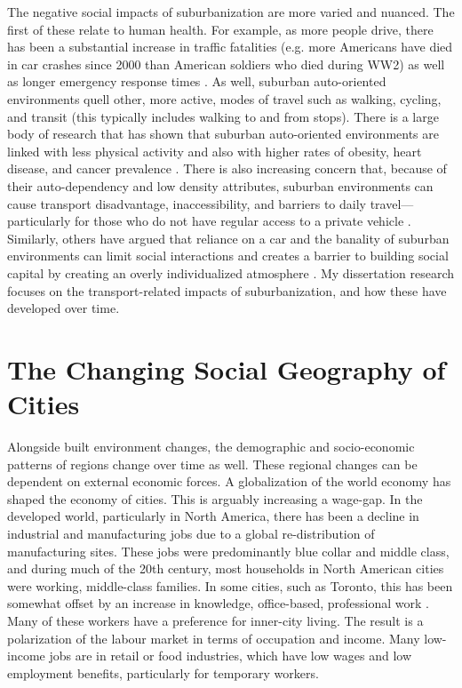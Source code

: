 The negative social impacts of suburbanization are more varied and nuanced. The first of these relate to human health. For example, as more people drive, there has been a substantial increase in traffic fatalities (e.g. more Americans have died in car crashes since 2000 than American soldiers who died during WW2) as well as longer emergency response times \cite{ewing_compactness_2015}. As well, suburban auto-oriented environments quell other, more active, modes of travel such as walking, cycling, and transit (this typically includes walking to and from stops). There is a large body of research that has shown that suburban auto-oriented environments are linked with less physical activity and also with higher rates of obesity, heart disease, and cancer prevalence \cite{ewing_compactness_2015,ewing_relationship_2003}. 
There is also increasing concern that, because of their auto-dependency and low density attributes, suburban environments can cause transport disadvantage, inaccessibility, and barriers to daily travel---particularly for those who do not have regular access to a private vehicle \cite{roorda_trip_2010,lucas_transport_2012,allen_planning_2020}. Similarly, others have argued that reliance on a car and the banality of suburban environments can limit social interactions and creates a barrier to building social capital by creating an overly individualized atmosphere \cite{jacobs_death_1961,kunstler_geography_1994}. My dissertation research focuses on the transport-related impacts of suburbanization, and how these have developed over time.






\section{The Changing Social Geography of Cities}

Alongside built environment changes, the demographic and socio-economic patterns of regions change over time as well. These regional changes can be dependent on external economic forces. A globalization of the world economy has shaped the economy of cities. This is arguably increasing a wage-gap. In the developed world, particularly in North America, there has been a decline in industrial and manufacturing jobs due to a global re-distribution of manufacturing sites. These jobs were predominantly blue collar and middle class, and during much of the 20th century, most households in North American cities were working, middle-class families. In some cities, such as Toronto, this has been somewhat offset by an increase in knowledge, office-based, professional work \cite{walks_social_2001}. Many of these workers have a preference for inner-city living. The result is a polarization of the labour market in terms of occupation and income. Many low-income jobs are in retail or food industries, which have low wages and low employment benefits, particularly for temporary workers. 

